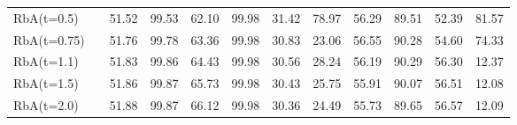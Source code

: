 \begin{table}[!tp]
{\begin{tabular}{l|c|cc|cc|cc|cc|cc}
RbA(t=0.5)     &       & 51.52 & 99.53 & 62.10 & 99.98 & 31.42 & 78.97 & 56.29 & 89.51 & 52.39 & 81.57 \\
RbA(t=0.75)    &       & 51.76 & 99.78 & 63.36 & 99.98 & 30.83 & 23.06 & 56.55 & 90.28 & 54.60 & 74.33 \\
RbA(t=1.1)     &       & 51.83 & 99.86 & 64.43 & 99.98 & 30.56 & 28.24 & 56.19 & 90.29 & 56.30 & 12.37 \\
RbA(t=1.5)     &       & 51.86 & 99.87 & 65.73 & 99.98 & 30.43 & 25.75 & 55.91 & 90.07 & 56.51 & 12.08 \\
RbA(t=2.0)     &       & 51.88 & 99.87 & 66.12 & 99.98 & 30.36 & 24.49 & 55.73 & 89.65 & 56.57 & 12.09 \\
\bottomrule
\end{tabular}}
\end{table}